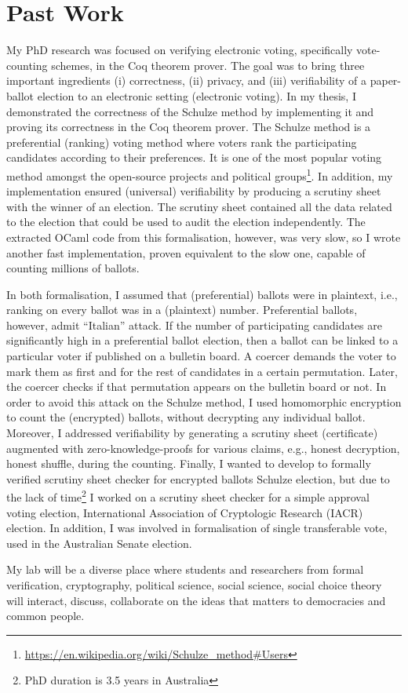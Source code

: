 \documentclass[a4paper]{article}
\begin{document}
\section{Past Work}
My PhD research was focused on verifying electronic voting, specifically vote-counting schemes, in 
the Coq theorem prover. The goal was to 
bring  three important ingredients (i) correctness, (ii) privacy, and (iii) verifiability of a 
paper-ballot election to 
an electronic setting (electronic voting).
In my thesis, I demonstrated the correctness of the Schulze method 
by implementing it and proving its correctness in the Coq theorem 
prover. The Schulze method is a preferential (ranking) voting method where voters rank the participating 
candidates according to their preferences. It is one of the most popular voting method amongst the open-source projects and 
political groups\footnote{\url{https://en.wikipedia.org/wiki/Schulze_method#Users}}.
In addition, my implementation 
ensured (universal) verifiability by producing a scrutiny sheet 
with the winner of an election. The scrutiny sheet contained all the data related 
to the election that could be used to audit the election independently. 
The extracted OCaml code from this formalisation, however, was 
very slow, so I wrote another fast implementation, proven equivalent to the slow one,
capable of counting millions of ballots.

In both formalisation, I assumed that (preferential) ballots were in plaintext, i.e., 
ranking on every ballot was in a (plaintext) number.  Preferential ballots, 
however, admit ``Italian'' attack. 
If the number of participating candidates are significantly high in 
a preferential ballot election,
then a ballot can be linked to a particular voter if published on a bulletin board.
A coercer demands the voter to mark them as first and for the rest of candidates
in a certain permutation. Later, the coercer checks if that permutation appears 
on the bulletin board or not. In order to
avoid this attack on the Schulze method, I used homomorphic encryption to count the (encrypted) ballots, without decrypting 
any individual ballot. Moreover, I addressed verifiability by generating a scrutiny sheet (certificate) 
augmented with zero-knowledge-proofs for various claims, e.g., honest decryption, honest shuffle,  
during the counting. 
Finally, I wanted to develop to formally 
verified scrutiny sheet checker for encrypted ballots Schulze election, but due to the lack of 
time\footnote{PhD duration is 3.5 years in Australia} I worked on a scrutiny sheet checker for a simple approval voting election,
International Association of Cryptologic Research (IACR) election.
In addition, I was involved in formalisation of single transferable vote, used in the Australian Senate election.




My lab will be a diverse place where students and researchers from formal 
verification, cryptography, 
political science, social science, social choice theory will interact, discuss, 
collaborate on the ideas that matters to democracies and common people. 
\end{document}
